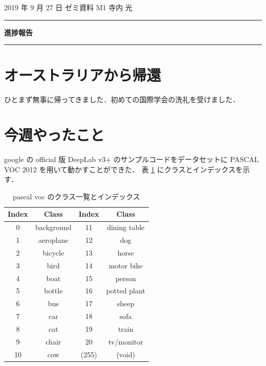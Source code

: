 \documentclass[onecolumn]{ujarticle}   %
\begin{document}
	\noindent

	\hspace{1em}
	2019 年 9 月 27 日
	ゼミ資料
	\hfill
	M1 寺内 光

	\vspace{2mm}

	\hrule

	\begin{center}
		{\Large \bf 進捗報告}
	\end{center}


	\hrule
	\vspace{3mm}

	\section{オーストラリアから帰還}
	ひとまず無事に帰ってきました．初めての国際学会の洗礼を受けました．

	\section{今週やったこと}
	google の official 版 DeepLab v3+ \cite{deeplabv3_official} のサンプルコードをデータセットに PASCAL VOC 2012 \cite{pascal-voc-2012} を用いて動かすことができた．
	表 \ref{tab:class_pascal_voc} にクラスとインデックスを示す．

	\begin{table}[h]
		\centering
		\caption{pascal voc のクラス一覧とインデックス}
		\vspace{-1mm}
		\label{tab:class_pascal_voc}
		\begin{tabular}{|c|c|c|c|} \hline
			Index&Class&Index&Class\\ \hline\hline
			0&background&11&dining table\\ \hline
			1&aeroplane&12&dog\\ \hline
			2&bicycle&13&horse\\ \hline
			3&bird&14&motor bike\\ \hline
			4&boat&15&person\\ \hline
			5&bottle&16&potted plant\\ \hline
			6&bus&17&sheep\\ \hline
			7&car&18&sofa\\ \hline
			8&cat&19&train\\ \hline
			9&chair&20&tv/monitor\\ \hline
			10&cow&(255)&(void)\\ \hline
		\end{tabular}
	\end{table}
\end{document}
